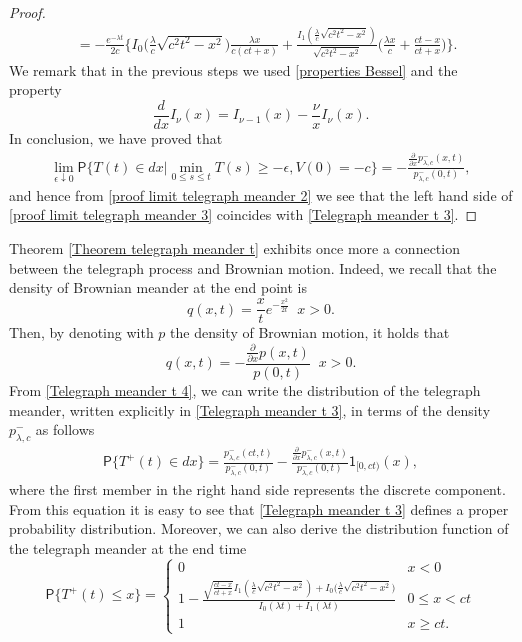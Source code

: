 \documentclass{article}
\theoremstyle{definition}
\numberwithin{equation}{section}
\begin{document}
\begin{proof}
\begin{align}
&=-\frac{e^{-\lambda t}}{2c}\bigg\{I_0\big(\frac{\lambda}{c}\sqrt{c^2t^2-x^2}\big)\frac{\lambda x}{c(ct+x)}+\frac{I_1(\frac{\lambda}{c}\sqrt{c^2t^2-x^2})}{\sqrt{c^2t^2-x^2}}\Big(\frac{\lambda x}{c}+\frac{ct-x}{ct+x}\Big)\bigg\}.
\end{align}
We remark that in the previous steps we used \eqref{properties Bessel} and the property
\begin{equation}\label{properties derivative Bessel}
\frac{d}{dx}I_\nu(x) = I_{\nu-1}(x) - \frac{\nu}{x}I_\nu(x).
\end{equation}
In conclusion, we have proved that
\begin{align}\label{proof limit telegraph meander 3}
\lim_{\epsilon \downarrow 0}\mathsf{P}\{T(t) \in dx |\min_{0\leq s \leq t} T(s) \geq -\epsilon,V(0) = -c\} = -\frac{\frac{\partial}{\partial x}p^{-}_{\lambda,c}(x,t)}{p_{\lambda,c}^{-}(0,t)},
\end{align}
and hence from \eqref{proof limit telegraph meander 2} we see that the left hand side of \eqref{proof limit telegraph meander 3} coincides with \eqref{Telegraph meander t 3}.
\end{proof}
Theorem \ref{Theorem telegraph meander t} exhibits once more a connection between the telegraph process and Brownian motion. Indeed, we recall that the density of Brownian meander at the end point is
\begin{equation}
q(x,t) = \frac{x}{t}e^{-\frac{x^2}{2t}} \;\; x>0.
\end{equation}
Then, by denoting with $p$ the density of Brownian motion, it holds that
\begin{equation}\label{Brownian meander t 2}
q(x,t) = -\frac{\frac{\partial}{\partial x}p(x,t)}{p(0,t)} \;\; x>0.
\end{equation}
From \eqref{Telegraph meander t 4}, we can write the distribution of the telegraph meander, written explicitly in \eqref{Telegraph meander t 3}, in terms of the density $p^{-}_{\lambda,c}$ as follows
\begin{align}\label{law of telegraph meander}
\mathsf{P}\{T^+(t) \in dx\} = \frac{p^{-}_{\lambda,c}(ct,t)}{p^{-}_{\lambda,c}(0,t)}-\frac{\frac{\partial}{\partial x}p^{-}_{\lambda,c}(x,t)}{p_{\lambda,c}^{-}(0,t)}\mathsf{1}_{[0,ct)}(x),
\end{align}
where the first member in the right hand side represents the discrete component. From this equation it is easy to see that \eqref{Telegraph meander t 3} defines a proper probability distribution.
Moreover, we can also derive the distribution function of the telegraph meander at the end time
\begin{equation}\label{Telegraph meander cdf}
\mathsf{P}\{T^+(t)\leq x\} = 
\begin{cases}
0 &x< 0\\
1-\frac{\sqrt{\frac{ct-x}{ct+x}}I_1(\frac{\lambda}{c}\sqrt{c^2t^2-x^2})+I_0\big(\frac{\lambda}{c}\sqrt{c^2t^2-x^2}\big)}{I_0(\lambda t)+I_1(\lambda t)} &0\leq x<ct \\
1 &x\geq ct.
\end{cases}
\end{equation}
\end{document}
